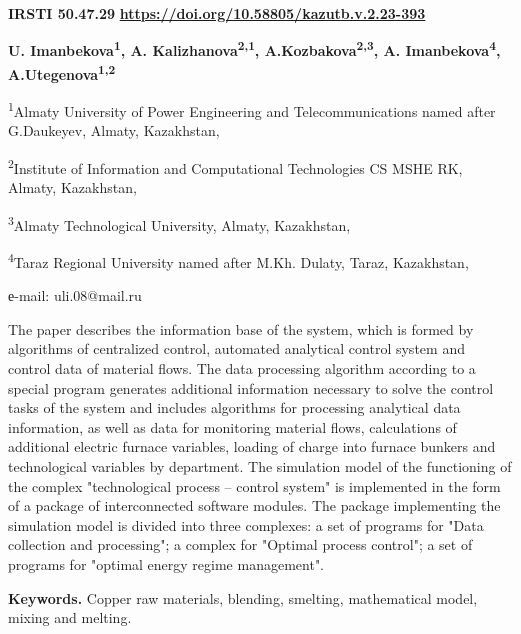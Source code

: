 \newpage
{}
{\bfseries IRSTI 50.47.29}
\hfill {\bfseries \href{https://doi.org/10.58805/kazutb.v.2.23-393}{https://doi.org/10.58805/kazutb.v.2.23-393}}


\begin{center}
{\bfseries U. Imanbekova\textsuperscript{1}\envelope, A.
Kalizhanova\textsuperscript{2,1}, A.Kozbakova\textsuperscript{2,3}, A.
Imanbekova\textsuperscript{4}, A.Utegenova\textsuperscript{1,2}}

\textsuperscript{1}Almaty University of Power Engineering and
Telecommunications named after G.Daukeyev, Almaty, Kazakhstan,

\textsuperscript{2}Institute of Information and Computational
Technologies CS MSHE RK, Almaty, Kazakhstan,

\textsuperscript{3}Almaty Technological University, Almaty, Kazakhstan,

\textsuperscript{4}Taraz Regional University named after M.Kh. Dulaty,
Taraz, Kazakhstan,

е-mail: uli.08@mail.ru
\end{center}

The paper describes the information base of the system, which is formed
by algorithms of centralized control, automated analytical control
system and control data of material flows. The data processing algorithm
according to a special program generates additional information
necessary to solve the control tasks of the system and includes
algorithms for processing analytical data information, as well as data
for monitoring material flows, calculations of additional electric
furnace variables, loading of charge into furnace bunkers and
technological variables by department. The simulation model of the
functioning of the complex "technological process -- control system" is
implemented in the form of a package of interconnected software modules.
The package implementing the simulation model is divided into three
complexes: a set of programs for "Data collection and processing"; a
complex for "Optimal process control"; a set of programs for "optimal
energy regime management".

{\bfseries Keywords.} Copper raw materials, blending, smelting,
mathematical model, mixing and melting.

